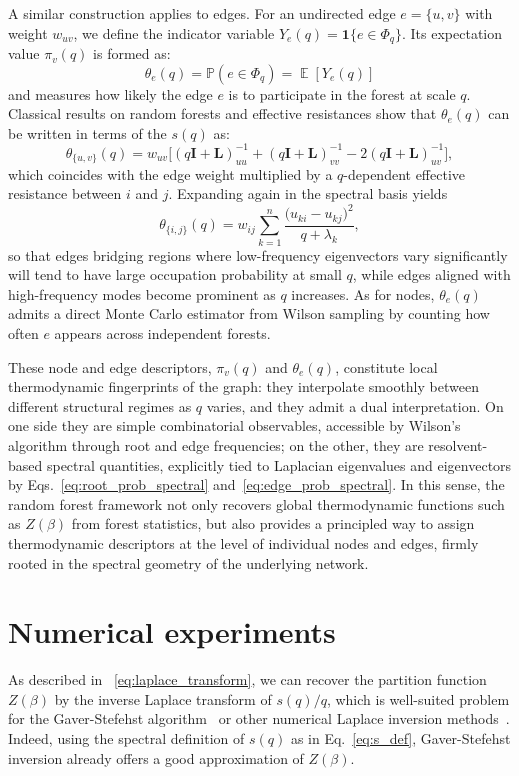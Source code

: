\documentclass[10pt,aps,pre,twocolumn,nofootinbib,superscriptaddress,longbibliography]{revtex4-2}
\newcommand{\bE}[1]{\operatorname{\mathbb{E}}\left\lbrack #1\right\rbrack}
\newcommand{\bI}{\mathbf{I}}
\newcommand{\bL}{\mathbf{L}}
\begin{document}
A similar construction applies to edges. 
For an undirected edge $e=\{u,v\}$ with weight $w_{uv}$, we define the indicator variable $Y_e(q)=\mathbf{1}\{e\in \Phi_q\}$.
Its expectation value $\pi _v(q)$ is formed as:
\begin{equation}
\theta_e(q) = \mathbb{P}\left( e\in\Phi_q\right) = \bE{Y_e(q)}
\end{equation}
and measures how likely the edge $e$ is to participate in the forest at scale $q$.
Classical results on random forests and effective resistances show that $\theta_e(q)$ can be written in terms of the $s(q)$ as:
\begin{equation}\label{eq:edge_prob_resistance}
  \theta_{\{u,v\}}(q) = w_{uv}\bigl[(q\bI+\bL)^{-1}_{uu} + (q\bI+\bL)^{-1}_{vv} - 2(q\bI+\bL)^{-1}_{uv}\bigr],
\end{equation}
which coincides with the edge weight multiplied by a $q$-dependent effective resistance between $i$ and $j$. 
Expanding again in the spectral basis yields
\begin{equation}\label{eq:edge_prob_spectral}
\theta_{\{i,j\}}(q) = w_{ij}\sum_{k=1}^n \frac{\bigl(u_{ki}-u_{kj}\bigr)^2}{q+\lambda_k},
\end{equation}
so that edges bridging regions where low-frequency eigenvectors vary significantly will tend to have large occupation probability at small $q$, while edges aligned with high-frequency modes become prominent as $q$ increases. 
As for nodes, $\theta_e(q)$ admits a direct Monte Carlo estimator from Wilson sampling by counting how often $e$ appears across independent forests.

These node and edge descriptors, $\pi_v(q)$ and $\theta_e(q)$, constitute local thermodynamic fingerprints of the graph: they interpolate smoothly between different structural regimes as $q$ varies, and they admit a dual interpretation.
On one side they are simple combinatorial observables, accessible by Wilson's algorithm through root and edge frequencies; on the other, they are resolvent-based spectral quantities, explicitly tied to Laplacian eigenvalues and eigenvectors by Eqs.~\ref{eq:root_prob_spectral} and~\ref{eq:edge_prob_spectral}. 
In this sense, the random forest framework not only recovers global thermodynamic functions such as $Z(\beta)$ from forest statistics, but also provides a principled way to assign thermodynamic descriptors at the level of individual nodes and edges, firmly rooted in the spectral geometry of the underlying network.

\section{Numerical experiments}
As described in ~\ref{eq:laplace_transform}, we can recover the partition function $Z(\beta)$ by the inverse Laplace transform of $s(q)/{q}$, which is well-suited problem for the Gaver-Stefehst algorithm~\cite{stehfest1970algorithm} or other numerical Laplace inversion methods~\cite{abate2006unified}.
Indeed, using the spectral definition of $s(q)$ as in Eq.~\ref{eq:s_def}, Gaver-Stefehst inversion already offers a good approximation of $Z(\beta)$.
\end{document}
